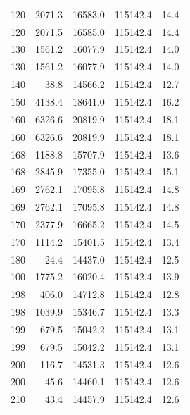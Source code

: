 \begin{table}[htbp]
\begin{tabular}{rrrrr}
    120 & \num{2071.3} & \num{16583.0} & \num{115142.4} & 14.4 \\
    120 & \num{2071.5} & \num{16585.0} & \num{115142.4} & 14.4 \\
    130 & \num{1561.2} & \num{16077.9} & \num{115142.4} & 14.0 \\
    130 & \num{1561.2} & \num{16077.9} & \num{115142.4} & 14.0 \\
    140 & \num{38.8} & \num{14566.2} & \num{115142.4} & 12.7 \\
    150 & \num{4138.4} & \num{18641.0} & \num{115142.4} & 16.2 \\
    160 & \num{6326.6} & \num{20819.9} & \num{115142.4} & 18.1 \\
    160 & \num{6326.6} & \num{20819.9} & \num{115142.4} & 18.1 \\
    168 & \num{1188.8} & \num{15707.9} & \num{115142.4} & 13.6 \\
    168 & \num{2845.9} & \num{17355.0} & \num{115142.4} & 15.1 \\
    169 & \num{2762.1} & \num{17095.8} & \num{115142.4} & 14.8 \\
    169 & \num{2762.1} & \num{17095.8} & \num{115142.4} & 14.8 \\
    170 & \num{2377.9} & \num{16665.2} & \num{115142.4} & 14.5 \\
    170 & \num{1114.2} & \num{15401.5} & \num{115142.4} & 13.4 \\
    180 & \num{24.4} & \num{14437.0} & \num{115142.4} & 12.5 \\
    100 & \num{1775.2} & \num{16020.4} & \num{115142.4} & 13.9 \\
    198 & \num{406.0} & \num{14712.8} & \num{115142.4} & 12.8 \\
    198 & \num{1039.9} & \num{15346.7} & \num{115142.4} & 13.3 \\
    199 & \num{679.5} & \num{15042.2} & \num{115142.4} & 13.1 \\
    199 & \num{679.5} & \num{15042.2} & \num{115142.4} & 13.1 \\
    200 & \num{116.7} & \num{14531.3} & \num{115142.4} & 12.6 \\
    200 & \num{45.6} & \num{14460.1} & \num{115142.4} & 12.6 \\
    210 & \num{43.4} & \num{14457.9} & \num{115142.4} & 12.6 \\
    \bottomrule
  \end{tabular}
\end{table}
